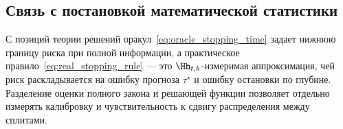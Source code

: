 \subsection{Связь с постановкой математической статистики}

С позиций теории решений \cite{ferguson1967} оракул~\eqref{eq:oracle_stopping_time} задает нижнюю границу риска при полной информации, а практическое правило~\eqref{eq:real_stopping_rule} --- это \(\Hh_{t,k}\)-измеримая аппроксимация, чей риск раскладывается на ошибку прогноза \(\tau^\star\) и ошибку остановки по глубине. Разделение оценки полного закона и решающей функции позволяет отдельно измерять калибровку \cite{guo2017calibration} и чувствительность к сдвигу распределения между сплитами.
